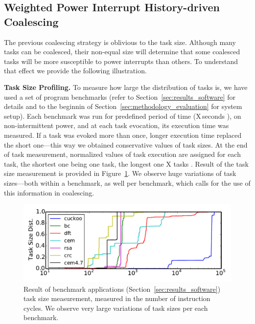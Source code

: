 \subsection{Weighted Power Interrupt History-driven Coalescing}

The previous coalescing strategy is oblivious to the task size. Although many tasks can be coalesced, their non-equal size will determine that some coalesced tasks will be more susceptible to power interrupts than others. To understand that effect we provide the following illustration. 

\textbf{Task Size Profiling.} To measure how large the distribution of tasks is, we have used a set of program benchmarks (refer to Section~\ref{sec:results_software} for details and to the beginnin of Section~\ref{sec:methodology_evaluation} for system setup). Each benchmark was run for predefined period of time (X\,seconds ), on non-intermittent power, and at each task evocation, its execution time was measured. If a task was evoked more than once, longer execution time replaced the short one---this way we obtained conservative values of task sizes. At the end of task measurement, normalized values of task execution are assigned for each task, the shortest one being one task, the longest one X tasks . Result of the task size measurement is provided in Figure~\ref{fig:task_profiling}. We observe huge variations of task sizes---both within a benchmark, as well per benchmark, which calls for the use of this information in coalescing.

\begin{figure}
	\centering
	\includegraphics[width=\columnwidth]{figures/TskDist.pdf}%
	\caption{Result of benchmark applications (Section~\ref{sec:results_software}) task size measurement, measured in the number of instruction cycles. We observe very large variations of task sizes per each benchmark. }
	\label{fig:task_profiling}
\end{figure}

